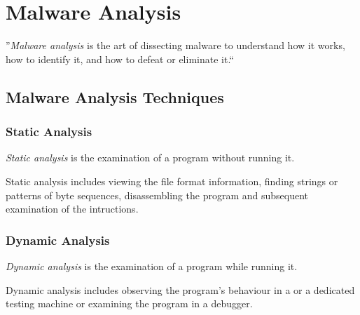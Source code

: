 \chapter{Malware Analysis} \label{chap:analysis}

\begin{definition}
''\emph{Malware analysis} is the art of dissecting malware to understand how it
works, how to identify it, and how to defeat or eliminate it.`` \cite[page xxviii]{sikorski12}
\end{definition} 

\section{Malware Analysis Techniques}

\subsection*{Static Analysis}

\begin{definition}
\emph{Static analysis} is the examination of a program without running it. \cite[page 2]{sikorski12}
\end{definition} 

Static analysis includes \eg{} viewing the file format information, finding strings or patterns of byte sequences, disassembling the program and subsequent examination of the intructions.

\subsection*{Dynamic Analysis}

\begin{definition}
\emph{Dynamic analysis} is the examination of a program while running it. \cite[page 2]{sikorski12}
\end{definition}

Dynamic analysis includes \eg{} observing the program's behaviour in a \VM{} or a dedicated testing machine or examining the program in a debugger.
